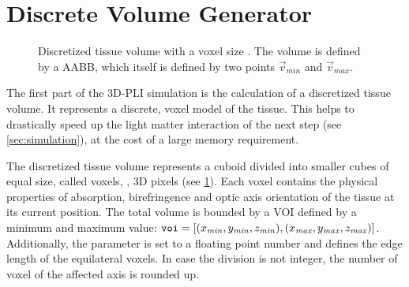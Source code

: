 \section{Discrete Volume Generator}
\label{sec:dv_generator}
%
\begin{figure}[!t]
\centering
\setlength{\tikzwidth}{0.5\textwidth}
\caption[]{Discretized tissue volume with a voxel size \voxelsize. The volume is defined by a \ac{AABB}, which itself is defined by two points $\vec{v}_\mathit{min}$ and $\vec{v}_\mathit{max}$.}
\label{fig:discVol}
\end{figure}
%
The first part of the \ac{3D-PLI} simulation is the calculation of a discretized tissue volume.
It represents a discrete, voxel model of the tissue.
This helps to drastically speed up the light matter interaction of the next step (see \cref{sec:simulation}), at the cost of a large memory requirement.
\par
%
The discretized tissue volume represents a cuboid divided into smaller cubes of equal size, called voxels, \ie{}, 3D pixels (see \cref{fig:discVol}).
Each voxel contains the physical properties of absorption, birefringence and optic axis orientation of the tissue at its current position.
The total volume is bounded by a \ac{VOI} defined by a minimum and maximum value: $\texttt{voi} = [(x_{\mathit{min}}, y_{\mathit{min}}, z_{\mathit{min}}), (x_{\mathit{max}}, y_{\mathit{max}}, z_{\mathit{max}})]$.
Additionally, the parameter \Voxelsize{} \voxelsize{} is set to a floating point number and defines the edge length of the equilateral voxels.
In case the division is not integer, the number of voxel of the affected axis is rounded up.
%
%
%
